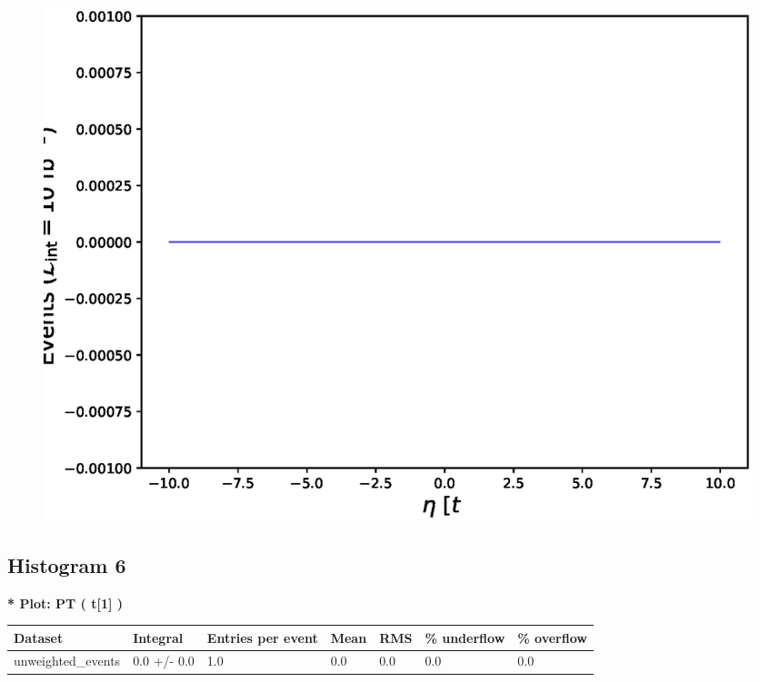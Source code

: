 \documentclass[a4paper, 10pt]{article}
\begin{document}
\begin{figure}[H]
  \begin{center}
    \includegraphics[scale=0.45]{selection_4.eps}\\
\caption{   }
  \end{center}
\end{figure}
      \newpage
\subsection{ Histogram 6}

\textbf{* Plot: PT ( t[1] ) }\\
   \begin{table}[H]
  \begin{center}
    \begin{tabular}{|m{23.0mm}|m{23.0mm}|m{18.0mm}|m{19.0mm}|m{19.0mm}|m{19.0mm}|m{19.0mm}|}
      \hline
      {\cellcolor{yellow}         Dataset}& {\cellcolor{yellow}         Integral}& {\cellcolor{yellow}         Entries per event}& {\cellcolor{yellow}         Mean}& {\cellcolor{yellow}         RMS}& {\cellcolor{yellow}         \% underflow}& {\cellcolor{yellow}         \% overflow}\\
      \hline
      {\cellcolor{white}         unweighted\_events}& {\cellcolor{white}         0.0 +/\-- 0.0}& {\cellcolor{white}         1.0}& {\cellcolor{white}         0.0}& {\cellcolor{white}         0.0}& {\cellcolor{green}         0.0}& {\cellcolor{green}         0.0}\\
\hline
    \end{tabular}
  \end{center}
\end{table}
\end{document}
